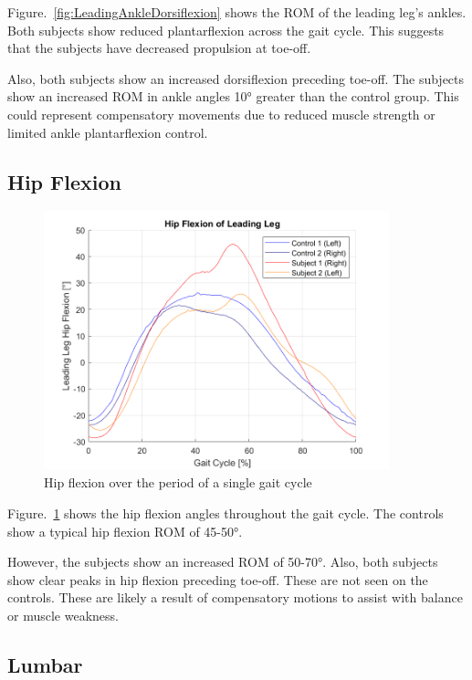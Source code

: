 \documentclass[conference]{IEEEtran}
\begin{document}
Figure.~\ref{fig:LeadingAnkleDorsiflexion} shows the ROM of the leading leg's ankles. Both subjects show reduced plantarflexion across the gait cycle. This suggests that the subjects have decreased propulsion at toe-off.

Also, both subjects show an increased dorsiflexion preceding toe-off. The subjects show an increased ROM in ankle angles 10° greater than the control group. This could represent compensatory movements due to reduced muscle strength or limited ankle plantarflexion control.

\subsection{Hip Flexion}

\begin{figure}[!ht]
\centering
\includegraphics[width=10cm]{hipflexion.png}
\caption{Hip flexion over the period of a single gait cycle}
\label{fig:HipFlexion}
\end{figure}

Figure.~\ref{fig:HipFlexion} shows the hip flexion angles throughout the gait cycle. The controls show a typical hip flexion ROM of 45-50°.

However, the subjects show an increased ROM of 50-70°. Also, both subjects show clear peaks in hip flexion preceding toe-off. These are not seen on the controls. These are likely a result of compensatory motions to assist with balance or muscle weakness.

\subsection{Lumbar}
\end{document}
